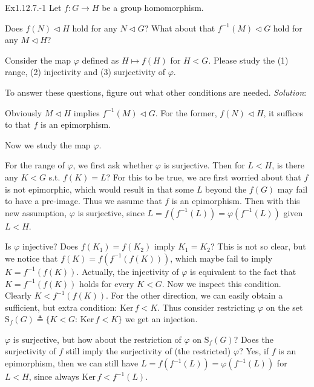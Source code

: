 \documentclass{article}
\newcommand{\nles}{\vartriangleleft}
\newcommand{\Ker}{\text{Ker}\,}
\begin{document}
\begin{Th}{Ex1.12.7.-1}
    Let $f: G\to H$ be a group homomorphism.
    \begin{compactenum}
        \item Does $f(N)\nles H$ hold for any $N\nles G$? What about that $f^{-1}(M) \nles G$ hold for any $M\nles H$?
        \item Consider the map $\varphi$ defined as $H\mapsto f(H)$ for $H<G$. Please study the (1) range, (2) injectivity and (3) surjectivity of $\varphi$.
    \end{compactenum}
    To answer these questions, figure out what other conditions are needed.
    \tcblower
    \textit{Solution}:
    \begin{compactenum}
        \item Obviously $M\nles H$ implies $f^{-1}(M) \nles G$. For the former, $f(N)\nles H$, it suffices to that $f$ is an epimorphism.
        \item Now we study the map $\varphi$.
        \begin{compactenum}
            \item For the range of $\varphi$, we first ask whether $\varphi$ is surjective. Then for $L<H$, is there any $K<G$ s.t. $f(K) = L$? For this to be true, we are first worried about that $f$ is not epimorphic, which would result in that some $L$ beyond the $f(G)$ may fail to have a pre-image. Thus we assume that \textcolor{P}{$f$ is an epimorphism}. Then with this new assumption, $\varphi$ is surjective, since $L = f(f^{-1}(L)) = \varphi(f^{-1}(L))$ given $L<H$.
            \item Is $\varphi$ injective? Does $f(K_1) = f(K_2)$ imply $K_1 = K_2$? This is not so clear, but we notice that $f(K) = f(f^{-1}(f(K)))$, which maybe fail to imply $K = f^{-1}(f(K))$. Actually, the injectivity of $\varphi$ is equivalent to the fact that $K = f^{-1}(f(K))$ holds for every $K < G$. Now we inspect this condition. Clearly $K<f^{-1}(f(K))$. For the other direction, we can easily obtain a sufficient, but extra condition: \textcolor{P}{$\Ker f<K$}. Thus consider restricting $\varphi$ on the set $\mathrm{S}_f(G)\triangleq \{K<G: \,\Ker f<K\}$ we get an injection. 
            \item $\varphi$ is surjective, but how about the restriction of $\varphi$ on $\mathrm{S}_f(G)$? Does the surjectivity of $f$ still imply the surjectivity of (the restricted) $\varphi$? Yes, if $f$ is an epimorphism, then we can still have $L = f(f^{-1}(L)) = \varphi(f^{-1}(L))$ for $L<H$, since always $\Ker f<f^{-1}(L)$.
        \end{compactenum}
    \end{compactenum}
\end{Th}
\end{document}
